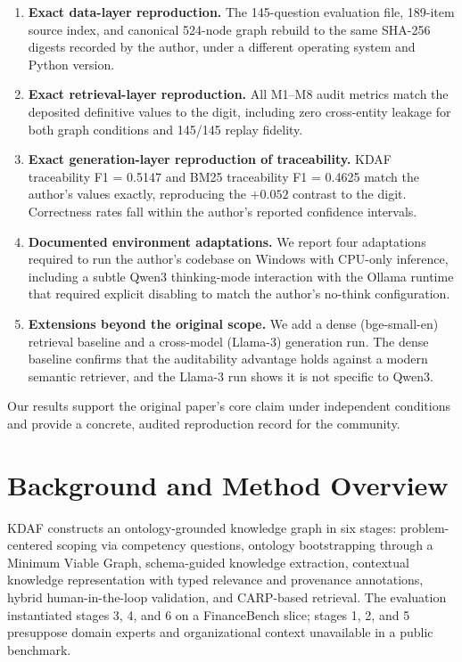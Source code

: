 \documentclass[11pt]{article}
\begin{document}
\begin{enumerate}
\item \textbf{Exact data-layer reproduction.} The 145-question evaluation file, 189-item source index, and canonical 524-node graph rebuild to the same SHA-256 digests recorded by the author, under a different operating system and Python version.
\item \textbf{Exact retrieval-layer reproduction.} All M1--M8 audit metrics match the deposited definitive values to the digit, including zero cross-entity leakage for both graph conditions and 145/145 replay fidelity.
\item \textbf{Exact generation-layer reproduction of traceability.} KDAF traceability F1 = 0.5147 and BM25 traceability F1 = 0.4625 match the author's values exactly, reproducing the $+0.052$ contrast to the digit. Correctness rates fall within the author's reported confidence intervals.
\item \textbf{Documented environment adaptations.} We report four adaptations required to run the author's codebase on Windows with CPU-only inference, including a subtle Qwen3 thinking-mode interaction with the Ollama runtime that required explicit disabling to match the author's no-think configuration.
\item \textbf{Extensions beyond the original scope.} We add a dense (bge-small-en) retrieval baseline and a cross-model (Llama-3) generation run. The dense baseline confirms that the auditability advantage holds against a modern semantic retriever, and the Llama-3 run shows it is not specific to Qwen3.
\end{enumerate}

Our results support the original paper's core claim under independent conditions and provide a concrete, audited reproduction record for the community.

\section{Background and Method Overview}

KDAF constructs an ontology-grounded knowledge graph in six stages: problem-centered scoping via competency questions, ontology bootstrapping through a Minimum Viable Graph, schema-guided knowledge extraction, contextual knowledge representation with typed relevance and provenance annotations, hybrid human-in-the-loop validation, and CARP-based retrieval. The evaluation instantiated stages 3, 4, and 6 on a FinanceBench slice; stages 1, 2, and 5 presuppose domain experts and organizational context unavailable in a public benchmark.
\end{document}
